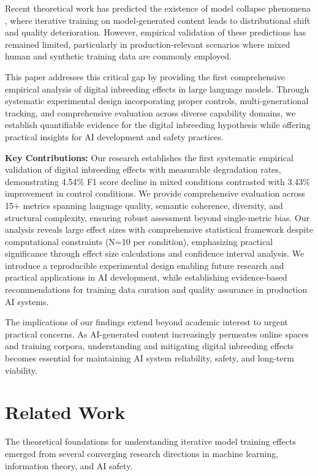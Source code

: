 \documentclass{article}
\begin{document}
Recent theoretical work has predicted the existence of model collapse phenomena \citep{shumailov2023curse}, where iterative training on model-generated content leads to distributional shift and quality deterioration. However, empirical validation of these predictions has remained limited, particularly in production-relevant scenarios where mixed human and synthetic training data are commonly employed.

This paper addresses this critical gap by providing the first comprehensive empirical analysis of digital inbreeding effects in large language models. Through systematic experimental design incorporating proper controls, multi-generational tracking, and comprehensive evaluation across diverse capability domains, we establish quantifiable evidence for the digital inbreeding hypothesis while offering practical insights for AI development and safety practices.

\textbf{Key Contributions:}
Our research establishes the first systematic empirical validation of digital inbreeding effects with measurable degradation rates, demonstrating 4.54\% F1 score decline in mixed conditions contrasted with 3.43\% improvement in control conditions. We provide comprehensive evaluation across 15+ metrics spanning language quality, semantic coherence, diversity, and structural complexity, ensuring robust assessment beyond single-metric bias. Our analysis reveals large effect sizes with comprehensive statistical framework despite computational constraints (N=10 per condition), emphasizing practical significance through effect size calculations and confidence interval analysis. We introduce a reproducible experimental design enabling future research and practical applications in AI development, while establishing evidence-based recommendations for training data curation and quality assurance in production AI systems.

The implications of our findings extend beyond academic interest to urgent practical concerns. As AI-generated content increasingly permeates online spaces and training corpora, understanding and mitigating digital inbreeding effects becomes essential for maintaining AI system reliability, safety, and long-term viability.

\section{Related Work}

The theoretical foundations for understanding iterative model training effects emerged from several converging research directions in machine learning, information theory, and AI safety.
\end{document}
